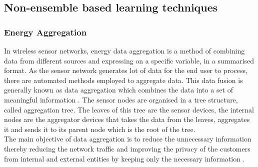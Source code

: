 \documentclass{sig-alternate}
\begin{document}
\subsection{Non-ensemble based learning techniques}

\subsubsection{Energy Aggregation}
In wireless sensor networks, energy data aggregation is a method of combining data from different sources and expressing on a specific variable, in a summarised format. As the sensor network generates lot of data for the end user to process, there are automated methods employed to aggregate data. This data fusion is generally known as data aggregation which combines the data into a set of meaningful information \cite{Heinzelman00energy}.
The sensor nodes are organised in a tree structure, called aggregation tree. The leaves of this tree are the sensor devices, the internal nodes are the aggregator devices that takes the data from the leaves, aggregates it and sends it to its parent node which is the root of the tree. \\
The main objective of data aggregation is to reduce the unnecessary information thereby reducing the network traffic and improving the privacy of the customers from internal and external entities by keeping only the necessary information \cite{taban}. 



\end{document}
